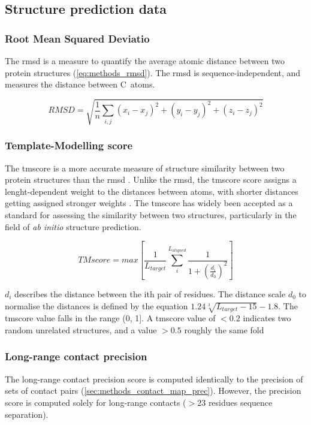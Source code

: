 \subsection{Structure prediction data}
\subsubsection{Root Mean Squared Deviatio}
The \gls{rmsd} is a measure to quantify the average atomic distance between two protein structures (\cref{eq:methods_rmsd}). The \gls{rmsd} is sequence-independent, and measures the distance between C\textalpha\ atoms.

\begin{equation}
RMSD=\sqrt{\frac{1}{n}\sum_{i,j}{(x_i-x_j)^2+(y_i-y_j)^2+(z_i-z_j)^2}}
\label{eq:methods_rmsd}
\end{equation}

\subsubsection{Template-Modelling score}
The \gls{tmscore} is a more accurate measure of structure similarity between two protein structures than the \gls{rmsd} \cite{Zhang2004-ha}. Unlike the \gls{rmsd}, the \gls{tmscore} score assigns a lenght-dependent weight to the distances between atoms, with shorter distances getting assigned stronger weights \cite{Zhang2004-ha}. The \gls{tmscore} has widely been accepted as a standard for assessing the similarity between two structures, particularly in the field of \textit{ab initio} structure prediction.

\begin{equation}
TMscore=max\left[\frac{1}{L_{target}}\sum_{i}^{L_{aligned}}{\frac{1}{1+\left(\frac{d_i}{d_0}\right)^2}}\right]
\label{eq:methods_tmscore}
\end{equation}

$d_i$ describes the distance between the ith pair of residues. The distance scale $d_0$ to normalise the distances is defined by the equation $1.24\sqrt[3]{L_{target}-15}-1.8$. The \gls{tmscore} value falls in the range (0, 1]. A \gls{tmscore} value of $<0.2$ indicates two random unrelated structures, and a value $>0.5$ roughly the same fold \cite{Xu2010-kr}

\subsubsection{Long-range contact precision}
The long-range contact precision score is computed identically to the precision of sets of contact pairs (\cref{sec:methods_contact_map_prec}). However, the precision score is computed solely for long-range contacts ($>23$ residues sequence separation).

